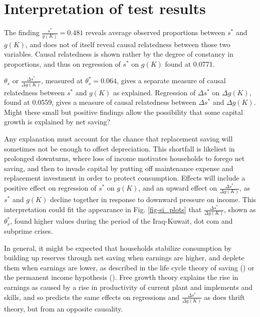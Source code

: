 \documentclass[a4paper,fleqn]{latex_styles/cas-sc}
\begin{document}
\FloatBarrier

\FloatBarrier
%

\section{Interpretation of test results\label{interpretation-of-test-results}}


The finding \(\frac{s^*}{g(K)} = 0.481\) reveals average observed proportions between \(s^*\) and \(g(K)\), and does not of itself reveal causal relatedness between those two variables. Causal relatedness is shown rather by the degree of constancy in proportions, and thus on regression of \(s^*\) on \(g(K)\) found at 0.0771.

\(\theta_s\) or \(\frac{\Delta s^*}{\Delta g(K)}\), measured at \(\theta_s^* = 0.064\), gives a separate measure of causal relatedness between \(s^*\) and \(g(K)\) as explained. Regression of \(\Delta s^*\) on \(\Delta g(K)\), found at 0.0559, gives a measure of causal relatedness between \(\Delta s^*\) and \(\Delta g(K)\). Might these small but positive findings allow the possibility that some capital growth is explained by net saving?

Any explanation must account for the chance that replacement saving will sometimes not be enough to offset depreciation. This shortfall is likeliest in prolonged downturns, where loss of income motivates households to forego net saving, and then to invade capital by putting off maintenance expense and replacement investment in order to protect consumption. Effects will include a positive effect on regression of \(s^*\) on \(g(K)\), and an upward effect on \(\frac{\Delta s^*}{\Delta g(K)}\), as \(s^*\) and \(g(K)\) decline together in response to downward pressure on income. This interpretation could fit the appearance in Fig. \ref{fig-si_plots} that \(\frac{\Delta s^*}{\Delta g(K)}\), shown as \(\theta^*_s\), found higher values during the period of the Iraq-Kuwait, dot com and subprime crises.

In general, it might be expected that households stabilize consumption by building up reserves through net saving when earnings are higher, and deplete them when earnings are lower, as described in the life cycle theory of saving (\cite{modigliani1954utility}) or the permanent income hypothesis (\cite{friedman1957permanent}). Free growth theory explains the rise in earnings as caused by a rise in productivity of current plant and implements and skills, and so predicts the same effects on regressions and \(\frac{\Delta s^*}{\Delta g(K)}\) as does thrift theory, but from an opposite causality.
\end{document}
